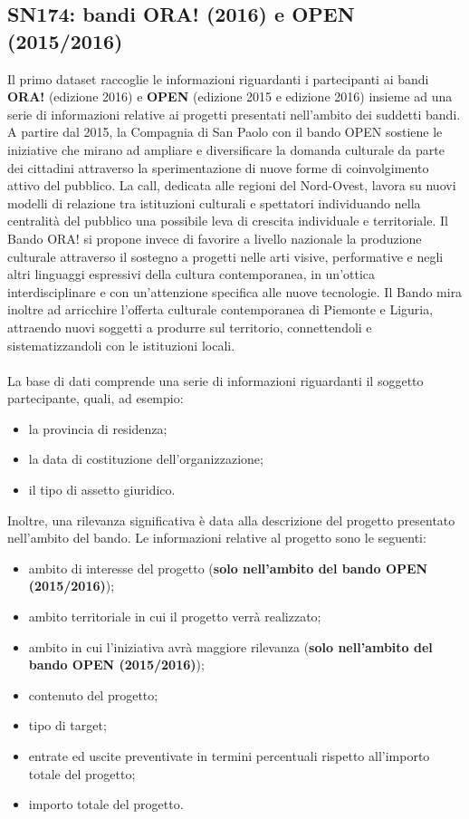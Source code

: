 \documentclass[a4paper,10pt]{scrartcl}
\begin{document}
\subsection{SN174: bandi ORA! (2016) e OPEN (2015/2016)}
Il primo dataset raccoglie le informazioni riguardanti i partecipanti ai bandi \textbf{ORA!} (edizione 2016) e \textbf{OPEN} (edizione 2015 e edizione 2016) insieme ad una serie di informazioni relative ai progetti presentati nell'ambito dei suddetti bandi. A partire dal 2015, la Compagnia di San Paolo con il bando OPEN sostiene le iniziative che mirano ad ampliare e diversificare la domanda culturale da parte dei cittadini attraverso la sperimentazione di nuove forme di coinvolgimento attivo del pubblico. La call, dedicata alle regioni del Nord-Ovest, lavora su nuovi modelli di relazione tra istituzioni culturali e spettatori individuando nella centralità del pubblico una possibile leva di crescita individuale e territoriale. Il Bando ORA! si propone invece di favorire a livello nazionale la produzione culturale attraverso il sostegno a progetti nelle arti visive, performative e negli altri linguaggi espressivi della cultura contemporanea, in un'ottica interdisciplinare e con un'attenzione specifica alle nuove tecnologie. Il Bando mira inoltre ad arricchire l'offerta culturale contemporanea di Piemonte e Liguria, attraendo nuovi soggetti a produrre sul territorio, connettendoli e sistematizzandoli con le istituzioni locali. 
\\ \\
La base di dati comprende una serie di informazioni riguardanti il soggetto partecipante, quali, ad esempio: 
\begin{itemize}
\item la provincia di residenza;
\item la data di costituzione dell’organizzazione;
\item il tipo di assetto giuridico.
\end{itemize}
Inoltre, una rilevanza significativa è data alla descrizione del progetto presentato nell'ambito del bando. Le informazioni relative al progetto sono le seguenti:
\begin{itemize}
\item ambito di interesse del progetto (\textbf{solo nell'ambito del bando OPEN (2015/2016)});
\item ambito territoriale in cui il progetto verrà realizzato;
\item ambito in cui l’iniziativa avrà maggiore rilevanza (\textbf{solo nell'ambito del bando OPEN (2015/2016)});
\item contenuto del progetto;
\item tipo di target;
\item entrate ed uscite preventivate in termini percentuali rispetto all'importo totale del progetto;
\item importo totale del progetto.
\end{itemize} 
\end{document}
